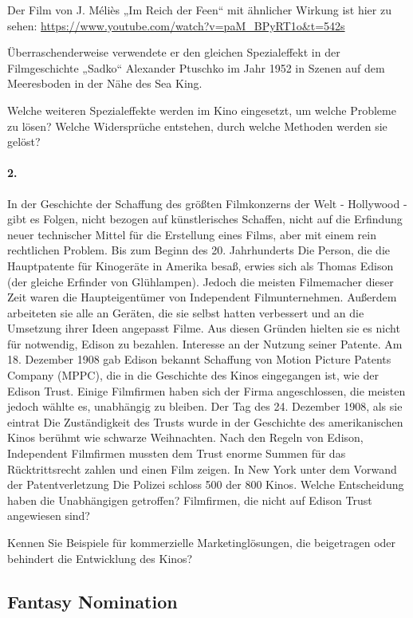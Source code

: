 \documentclass[11pt,a4paper]{article}
\begin{document}
Der Film von J. Méliès „Im Reich der Feen“ mit ähnlicher Wirkung ist hier zu
sehen: \url{https://www.youtube.com/watch?v=paM_BPyRT1o&t=542s}

Überraschenderweise verwendete er den gleichen Spezialeffekt in der
Filmgeschichte „Sadko“ Alexander Ptuschko im Jahr 1952 in Szenen auf dem
Meeresboden in der Nähe des Sea King.

Welche weiteren Spezialeffekte werden im Kino eingesetzt, um welche Probleme
zu lösen? Welche Widersprüche entstehen, durch welche Methoden werden sie
gelöst?

\paragraph{2.}
In der Geschichte der Schaffung des größten Filmkonzerns der Welt - Hollywood
- gibt es Folgen, nicht bezogen auf künstlerisches Schaffen, nicht auf die
Erfindung neuer technischer Mittel für die Erstellung eines Films, aber mit
einem rein rechtlichen Problem. Bis zum Beginn des 20. Jahrhunderts Die
Person, die die Hauptpatente für Kinogeräte in Amerika besaß, erwies sich als
Thomas Edison (der gleiche Erfinder von Glühlampen). Jedoch die meisten
Filmemacher dieser Zeit waren die Haupteigentümer von Independent
Filmunternehmen. Außerdem arbeiteten sie alle an Geräten, die sie selbst
hatten verbessert und an die Umsetzung ihrer Ideen angepasst Filme. Aus diesen
Gründen hielten sie es nicht für notwendig, Edison zu bezahlen.  Interesse an
der Nutzung seiner Patente. Am 18. Dezember 1908 gab Edison bekannt Schaffung
von Motion Picture Patents Company (MPPC), die in die Geschichte des Kinos
eingegangen ist, wie der Edison Trust. Einige Filmfirmen haben sich der Firma
angeschlossen, die meisten jedoch wählte es, unabhängig zu bleiben. Der Tag
des 24. Dezember 1908, als sie eintrat Die Zuständigkeit des Trusts wurde in
der Geschichte des amerikanischen Kinos berühmt wie schwarze Weihnachten. Nach
den Regeln von Edison, Independent Filmfirmen mussten dem Trust enorme Summen
für das Rücktrittsrecht zahlen und einen Film zeigen. In New York unter dem
Vorwand der Patentverletzung Die Polizei schloss 500 der 800 Kinos. Welche
Entscheidung haben die Unabhängigen getroffen?  Filmfirmen, die nicht auf
Edison Trust angewiesen sind?

Kennen Sie Beispiele für kommerzielle Marketinglösungen, die beigetragen oder
behindert die Entwicklung des Kinos?

\subsection*{Fantasy Nomination}
\end{document}
